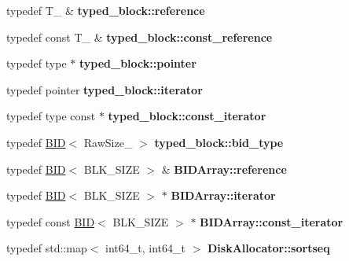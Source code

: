 \begin{CompactItemize}
\item 
\hypertarget{group__mnglayer_g521aff2a3700245029372deb0be2b287}{
typedef T\_\- \& \textbf{typed\_\-block::reference}}
\label{group__mnglayer_g521aff2a3700245029372deb0be2b287}

\item 
\hypertarget{group__mnglayer_g34e897ac51826913281aaf4b10465659}{
typedef const T\_\- \& \textbf{typed\_\-block::const\_\-reference}}
\label{group__mnglayer_g34e897ac51826913281aaf4b10465659}

\item 
\hypertarget{group__mnglayer_gbc7c8a98ff603c8087eb1fd8974ea270}{
typedef type $\ast$ \textbf{typed\_\-block::pointer}}
\label{group__mnglayer_gbc7c8a98ff603c8087eb1fd8974ea270}

\item 
\hypertarget{group__mnglayer_g75bd38227d7b7e5b772911ab87d0e7bc}{
typedef pointer \textbf{typed\_\-block::iterator}}
\label{group__mnglayer_g75bd38227d7b7e5b772911ab87d0e7bc}

\item 
\hypertarget{group__mnglayer_g7cbb990a4e44249df63a9e878aec6338}{
typedef type const $\ast$ \textbf{typed\_\-block::const\_\-iterator}}
\label{group__mnglayer_g7cbb990a4e44249df63a9e878aec6338}

\item 
\hypertarget{group__mnglayer_gae0703379ce10cdd001a53c8983bbdf5}{
typedef \hyperlink{structBID}{BID}$<$ RawSize\_\- $>$ \textbf{typed\_\-block::bid\_\-type}}
\label{group__mnglayer_gae0703379ce10cdd001a53c8983bbdf5}

\item 
\hypertarget{group__mnglayer_g3a47a283737239beb0f14acc9f7ba0e8}{
typedef \hyperlink{structBID}{BID}$<$ BLK\_\-SIZE $>$ \& \textbf{BIDArray::reference}}
\label{group__mnglayer_g3a47a283737239beb0f14acc9f7ba0e8}

\item 
\hypertarget{group__mnglayer_g8db66544ca4882b873e2c8e7cbc39155}{
typedef \hyperlink{structBID}{BID}$<$ BLK\_\-SIZE $>$ $\ast$ \textbf{BIDArray::iterator}}
\label{group__mnglayer_g8db66544ca4882b873e2c8e7cbc39155}

\item 
\hypertarget{group__mnglayer_g4dadf075f31927a829a2c877b924170b}{
typedef const \hyperlink{structBID}{BID}$<$ BLK\_\-SIZE $>$ $\ast$ \textbf{BIDArray::const\_\-iterator}}
\label{group__mnglayer_g4dadf075f31927a829a2c877b924170b}

\item 
\hypertarget{group__mnglayer_g3b319db3ec1e563341cd5e30eab3f0ab}{
typedef std::map$<$ int64\_\-t, int64\_\-t $>$ \textbf{DiskAllocator::sortseq}}
\label{group__mnglayer_g3b319db3ec1e563341cd5e30eab3f0ab}

\end{CompactItemize}
